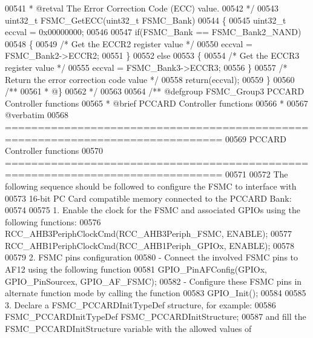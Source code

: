 \begin{DoxyCode}
00541 \textcolor{comment}{  * @retval The Error Correction Code (ECC) value.}
00542 \textcolor{comment}{  */}
00543 uint32\_t FSMC_GetECC(uint32\_t FSMC\_Bank)
00544 \{
00545   uint32\_t eccval = 0x00000000;
00546 
00547   \textcolor{keywordflow}{if}(FSMC\_Bank == FSMC_Bank2_NAND)
00548   \{
00549     \textcolor{comment}{/* Get the ECCR2 register value */}
00550     eccval = FSMC_Bank2->ECCR2;
00551   \}
00552   \textcolor{keywordflow}{else}
00553   \{
00554     \textcolor{comment}{/* Get the ECCR3 register value */}
00555     eccval = FSMC_Bank3->ECCR3;
00556   \}
00557   \textcolor{comment}{/* Return the error correction code value */}
00558   \textcolor{keywordflow}{return}(eccval);
00559 \}
00560 \textcolor{comment}{/**}
00561 \textcolor{comment}{  * @\}}
00562 \textcolor{comment}{  */}
00563 
00564 \textcolor{comment}{/** @defgroup FSMC\_Group3 PCCARD Controller functions}
00565 \textcolor{comment}{ *  @brief   PCCARD Controller functions }
00566 \textcolor{comment}{ *}
00567 \textcolor{comment}{@verbatim   }
00568 \textcolor{comment}{ ===============================================================================}
00569 \textcolor{comment}{                    PCCARD Controller functions}
00570 \textcolor{comment}{ ===============================================================================  }
00571 \textcolor{comment}{}
00572 \textcolor{comment}{ The following sequence should be followed to configure the FSMC to interface with}
00573 \textcolor{comment}{ 16-bit PC Card compatible memory connected to the PCCARD Bank:}
00574 \textcolor{comment}{ }
00575 \textcolor{comment}{   1. Enable the clock for the FSMC and associated GPIOs using the following functions:}
00576 \textcolor{comment}{          RCC\_AHB3PeriphClockCmd(RCC\_AHB3Periph\_FSMC, ENABLE);}
00577 \textcolor{comment}{          RCC\_AHB1PeriphClockCmd(RCC\_AHB1Periph\_GPIOx, ENABLE);}
00578 \textcolor{comment}{}
00579 \textcolor{comment}{   2. FSMC pins configuration }
00580 \textcolor{comment}{       - Connect the involved FSMC pins to AF12 using the following function }
00581 \textcolor{comment}{          GPIO\_PinAFConfig(GPIOx, GPIO\_PinSourcex, GPIO\_AF\_FSMC); }
00582 \textcolor{comment}{       - Configure these FSMC pins in alternate function mode by calling the function}
00583 \textcolor{comment}{          GPIO\_Init();    }
00584 \textcolor{comment}{       }
00585 \textcolor{comment}{   3. Declare a FSMC\_PCCARDInitTypeDef structure, for example:}
00586 \textcolor{comment}{          FSMC\_PCCARDInitTypeDef  FSMC\_PCCARDInitStructure;}
00587 \textcolor{comment}{      and fill the FSMC\_PCCARDInitStructure variable with the allowed values of}

\end{DoxyCode}
